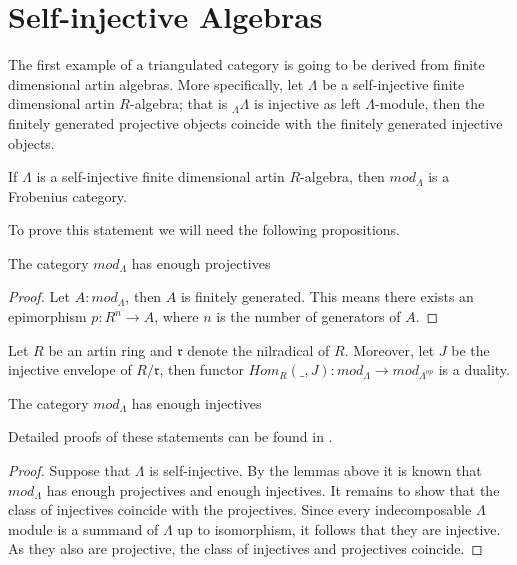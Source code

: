 \section{Self-injective Algebras}

    The first example of a triangulated category is going to be derived from finite dimensional artin algebras. More specifically, let $\Lambda$ be a self-injective finite dimensional artin $R$-algebra; that is $_{\Lambda}\Lambda$ is injective as left $\Lambda$-module, then the finitely generated projective objects coincide with the finitely generated injective objects.

    \begin{prop}
        If $\Lambda$ is a self-injective finite dimensional artin $R$-algebra, then $mod_{\Lambda}$ is a Frobenius category.
    \end{prop}

    To prove this statement we will need the following propositions.

    \begin{lemma}
        The category $mod_{\Lambda}$ has enough projectives
    \end{lemma}

    \begin{proof}
        Let $A:mod_{\Lambda}$, then $A$ is finitely generated. This means there exists an epimorphism $p:R^n\rightarrow A$, where $n$ is the number of generators of $A$.
    \end{proof}

    \begin{lemma}
        Let $R$ be an artin ring and $\mathfrak{r}$ denote the nilradical of $R$. Moreover, let $J$ be the injective envelope of $R/\mathfrak{r}$, then functor $Hom_R(\_,J):mod_{\Lambda}\rightarrow mod_{\Lambda^{op}}$ is a duality.
    \end{lemma}

    \begin{corollary}
        The category $mod_{\Lambda}$ has enough injectives
    \end{corollary}

    Detailed proofs of these statements can be found in \cite{Rei95}.

    \begin{proof}
        Suppose that $\Lambda$ is self-injective. By the lemmas above it is known that $mod_{\Lambda}$ has enough projectives and enough injectives. It remains to show that the class of injectives coincide with the projectives. Since every indecomposable $\Lambda$ module is a summand of $\Lambda$ up to isomorphism, it follows that they are injective. As they also are projective, the class of injectives and projectives coincide.
    \end{proof}

